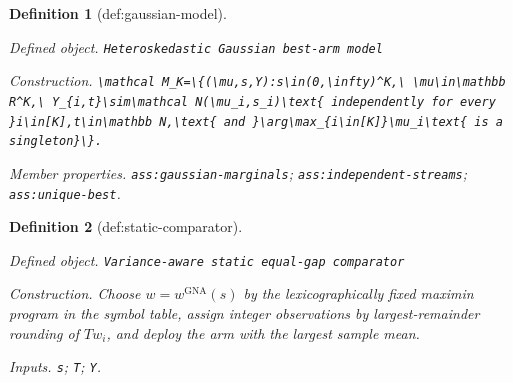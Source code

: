 \documentclass{article}
\newtheorem{definition}{Definition}
\begin{document}
\begin{definition}[def:gaussian-model]\label{def:gaussian-model}
\par\smallskip\noindent\emph{Defined object.} \texttt{Heteroskedastic Gaussian best-\allowbreak{}arm model}
\par\smallskip\noindent\emph{Construction.} \texttt{\textbackslash{}\allowbreak{}mathcal M\_\allowbreak{}K=\allowbreak{}\textbackslash{}\allowbreak{}\{(\textbackslash{}\allowbreak{}mu,\allowbreak{}s,\allowbreak{}Y):\allowbreak{}s\textbackslash{}\allowbreak{}in(0,\allowbreak{}\textbackslash{}\allowbreak{}infty)\textasciicircum{}K,\allowbreak{}\textbackslash{}\allowbreak{} \textbackslash{}\allowbreak{}mu\textbackslash{}\allowbreak{}in\textbackslash{}\allowbreak{}mathbb R\textasciicircum{}K,\allowbreak{}\textbackslash{}\allowbreak{} Y\_\allowbreak{}\{i,\allowbreak{}t\}\allowbreak{}\textbackslash{}\allowbreak{}sim\textbackslash{}\allowbreak{}mathcal N(\textbackslash{}\allowbreak{}mu\_\allowbreak{}i,\allowbreak{}s\_\allowbreak{}i)\textbackslash{}\allowbreak{}text\{ independently for every \}\allowbreak{}i\textbackslash{}\allowbreak{}in[K],\allowbreak{}t\textbackslash{}\allowbreak{}in\textbackslash{}\allowbreak{}mathbb N,\allowbreak{}\textbackslash{}\allowbreak{}text\{ and \}\allowbreak{}\textbackslash{}\allowbreak{}arg\textbackslash{}\allowbreak{}max\_\allowbreak{}\{i\textbackslash{}\allowbreak{}in[K]\}\allowbreak{}\textbackslash{}\allowbreak{}mu\_\allowbreak{}i\textbackslash{}\allowbreak{}text\{ is a singleton\}\allowbreak{}\textbackslash{}\allowbreak{}\}\allowbreak{}.}
\par\smallskip\noindent\emph{Member properties.} \texttt{ass:\allowbreak{}gaussian-\allowbreak{}marginals}; \texttt{ass:\allowbreak{}independent-\allowbreak{}streams}; \texttt{ass:\allowbreak{}unique-\allowbreak{}best}.
\end{definition}

\begin{definition}[def:static-comparator]\label{def:static-comparator}
\par\smallskip\noindent\emph{Defined object.} \texttt{Variance-\allowbreak{}aware static equal-\allowbreak{}gap comparator}
\par\smallskip\noindent\emph{Construction.} Choose \(w=w^{\mathrm{GNA}}(s)\) by the lexicographically fixed maximin program in the symbol table, assign integer observations by largest-remainder rounding of \(Tw_i\), and deploy the arm with the largest sample mean.
\par\smallskip\noindent\emph{Inputs.} \texttt{s}; \texttt{T}; \texttt{Y}.
\end{definition}
\end{document}

